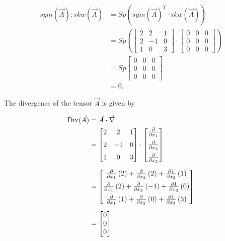 \documentclass[12pt,bibstyle=none,pagenumberinfooter]{ifmdocument}
\begin{document}
\begin{align}
    sym(\Vec{A}):skw(\vec{A})
    &   = Sp\left(sym(\Vec{A})^T \cdot skw(\Vec{A}) \right) \\
    &   = Sp \left(\begin{bmatrix}
        2 & 2 & 1 \\ 2 & -1 & 0 \\ 1 & 0 & 3
        \end{bmatrix} \cdot \begin{bmatrix}
        0 & 0 & 0 \\ 0 & 0 & 0 \\ 0 & 0 & 0
        \end{bmatrix} \right) \\
    &   = Sp \begin{bmatrix}
                0 & 0 & 0 \\ 0 & 0 & 0 \\ 0 & 0 & 0
            \end{bmatrix} \\
    &   = 0.
\end{align}

The divergence of the tensor $ \Vec{A}$ is given by

\begin{align}
    \operatorname{Div}(\Vec{A})
    &   = \Vec{A} \cdot \Vec{\nabla} \\
    &   = \begin{bmatrix}
        2 & 2 & 1 \\[2mm] 2 & -1 & 0 \\[2mm] 1 & 0 & 3
        \end{bmatrix} \cdot \begin{bmatrix}
            \frac{\partial}{\partial x_1} \\[2mm] \frac{\partial}{\partial x_2} \\[2mm]  \frac{\partial}{\partial x_3}
        \end{bmatrix} \\[2mm]
    &   = \begin{bmatrix}
        \frac{\partial}{\partial x_1}\,(2) + \frac{\partial}{\partial x_2}\, (2) + \frac{\partial 1}{\partial x_3}\, (1) \\[2mm]
        \frac{\partial}{\partial x_1}\,(2) + \frac{\partial}{\partial x_2}\, (-1) + \frac{\partial 1}{\partial x_3}\, (0) \\[2mm]
        \frac{\partial}{\partial x_1}\,(1) + \frac{\partial}{\partial x_2}\, (0) + \frac{\partial 1}{\partial x_3}\, (3) \\
    \end{bmatrix} \\[2mm]
    &   = \begin{bmatrix}
        0 \\ 0 \\ 0
        \end{bmatrix}
\end{align}
    
\end{document}
